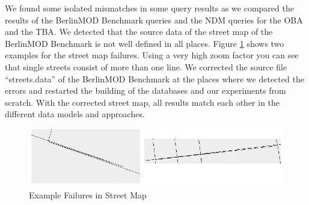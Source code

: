 \documentclass[a4paper]{article}
\newcommand{\bmodb} {BerlinMOD Benchmark}
\begin{document}
{We found some isolated mismatches in some query results as we compared the results
of the \bmodb{} queries and the NDM queries for the OBA and the TBA. We detected
that the source data of the street map of the \bmodb{} is not well defined in all places.
Figure \ref{fig:routefailure} shows two examples for the street map failures. Using
a very high zoom factor you can see that single streets consist of more than one
line. We corrected the source file ``streets.data'' of the \bmodb{} at the places
where we detected the errors and restarted the building of the databases and our
experiments from scratch. With the corrected street map, all results match
each other in the different data models and approaches.
\begin{figure}[H]
\begin{center}
   \includegraphics[scale=1.0]{routefailure.eps}
   \caption{Example Failures in Street Map}
   \label{fig:routefailure}
   \end{center}
\end{figure}
}
\end{document}

